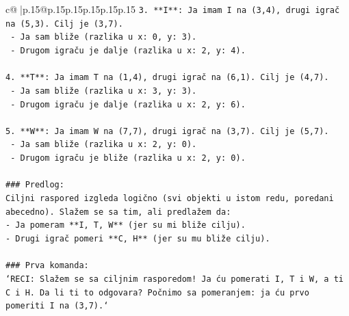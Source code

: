 \documentclass{article}
\begin{document}
{\begin{supertabular}{c@{$\;$}|p{.15\linewidth}@{}p{.15\linewidth}p{.15\linewidth}p{.15\linewidth}p{.15\linewidth}p{.15\linewidth}}
{{{\texttt{3. **I**: Ja imam I na (3,4), drugi igrač na (5,3). Cilj je (3,7).} \\
\texttt{   {-} Ja sam bliže (razlika u x: 0, y: 3).} \\
\texttt{   {-} Drugom igraču je dalje (razlika u x: 2, y: 4).} \\
\\ 
\texttt{4. **T**: Ja imam T na (1,4), drugi igrač na (6,1). Cilj je (4,7).} \\
\texttt{   {-} Ja sam bliže (razlika u x: 3, y: 3).} \\
\texttt{   {-} Drugom igraču je dalje (razlika u x: 2, y: 6).} \\
\\ 
\texttt{5. **W**: Ja imam W na (7,7), drugi igrač na (3,7). Cilj je (5,7).} \\
\texttt{   {-} Ja sam bliže (razlika u x: 2, y: 0).} \\
\texttt{   {-} Drugom igraču je bliže (razlika u x: 2, y: 0).} \\
\\ 
\texttt{\#\#\# Predlog:} \\
\texttt{Ciljni raspored izgleda logično (svi objekti u istom redu, poredani abecedno). Slažem se sa tim, ali predlažem da:} \\
\texttt{{-} Ja pomeram **I, T, W** (jer su mi bliže cilju).} \\
\texttt{{-} Drugi igrač pomeri **C, H** (jer su mu bliže cilju).} \\
\\ 
\texttt{\#\#\# Prva komanda:} \\
\texttt{`RECI: Slažem se sa ciljnim rasporedom! Ja ću pomerati I, T i W, a ti C i H. Da li ti to odgovara? Počnimo sa pomeranjem: ja ću prvo pomeriti I na (3,7).`} \\
            }
        }
    }
     \\ \\


\end{supertabular}}
\end{document}
